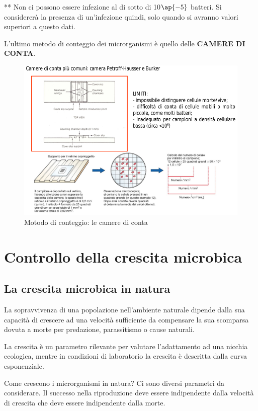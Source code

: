 \documentclass[11pt]{book}
\begin{document}
** Non ci possono essere infezione al di sotto di 10$\ap{-5}$ batteri. Si considererà la presenza di un'infezione quindi, solo quando si avranno valori superiori a questo dati.

\vspace{1em}
L'ultimo metodo di conteggio dei microrganismi è quello delle \textbf{CAMERE DI CONTA}.


\begin{figure}[htp]
\centering
\includegraphics[scale=0.5]{img/Camere di conta.png}
\caption{Motodo di conteggio: le camere di conta}
\label{}
\end{figure}

\chapter{Controllo della crescita microbica}
\section{La crescita microbica in natura}
La sopravvivenza di una popolazione nell’ambiente naturale dipende dalla sua capacità di crescere ad una velocità sufficiente da compensare la sua scomparsa dovuta a morte per predazione, parassitismo o cause naturali.

La crescita è un parametro rilevante per valutare l’adattamento ad una nicchia ecologica, mentre in condizioni di laboratorio la crescita è descritta dalla curva esponenziale.

Come crescono i microrganismi in natura? Ci sono diversi parametri da considerare. Il successo nella riproduzione deve essere indipendente dalla velocità di crescita che deve essere indipendente dalla morte.
\end{document}

